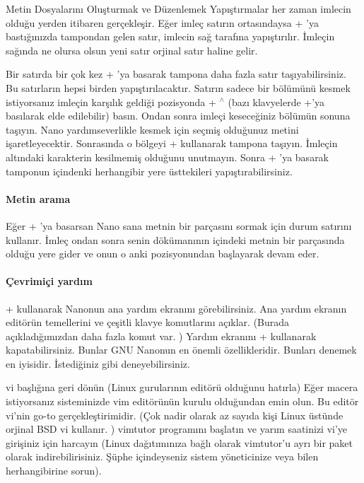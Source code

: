 \begin{section}{Metin Dosyalarını Oluşturmak ve Düzenlemek}
Yapıştırmalar her zaman imlecin olduğu yerden itibaren gerçekleşir. Eğer imleç satırın ortasındaysa \Ctrl + 'ya bastığınızda tampondan gelen satır, imlecin sağ tarafına yapıştırılır. İmleçin sağında ne olursa olsun yeni satır orjinal satır haline gelir. 

Bir satırda bir çok kez \Ctrl + 'ya basarak tampona daha fazla satır taşıyabilirsiniz. Bu satırların hepsi birden yapıştırılacaktır.
Satırın sadece bir bölümünü kesmek istiyorsanız imleçin karşılık geldiği pozisyonda \Ctrl + $ ^\wedge $ (bazı klavyelerde \Alt+'ya basılarak elde edilebilir) basın. Ondan sonra imleçi keseceğiniz bölümün sonuna taşıyın. Nano yardımseverlikle kesmek için seçmiş olduğunuz metini işaretleyecektir. Sonrasında o bölgeyi \Ctrl +  kullanarak tampona taşıyın. İmleçin altındaki karakterin kesilmemiş olduğunu unutmayın. Sonra \Ctrl + 'ya basarak tamponun içindenki herhangibir yere üsttekileri yapıştırabilirsiniz. 

\paragraph{Metin arama}{Eğer \Ctrl + 'ya basarsan Nano sana metnin bir parçasını sormak için durum satırını kullanır. İmleç ondan sonra senin dökümanının içindeki metnin bir parçasında olduğu yere gider ve onun o anki pozisyonundan başlayarak devam eder.}

\paragraph{Çevrimiçi yardım}{\Ctrl +  kullanarak Nanonun ana yardım ekranını görebilirsiniz. Ana yardım ekranın editörün temellerini ve çeşitli klavye komutlarını açıklar. (Burada açıkladığımızdan daha fazla komut var. ) Yardım ekranını \Ctrl +  kullanarak kapatabilirsiniz.
Bunlar GNU Nanonun en önemli özellikleridir. Bunları denemek en iyisidir. İstediğiniz gibi deneyebilirsiniz.}

vi başlığına geri dönün (Linux gurularının editörü olduğunu hatırla) Eğer macera istiyorsanız sisteminizde vim editörünün kurulu olduğundan emin olun. Bu editör vi’nin go-to gerçekleştirimidir. (Çok nadir olarak az sayıda kişi Linux üstünde orjinal BSD vi kullanır. ) vimtutor programını başlatın ve yarım saatinizi vi’ye girişiniz için harcayın (Linux dağıtımınıza bağlı olarak vimtutor’u ayrı bir paket olarak indirebilirisiniz. Şüphe içindeyseniz sistem yöneticinize veya bilen herhangibirine sorun).


\end{section}
